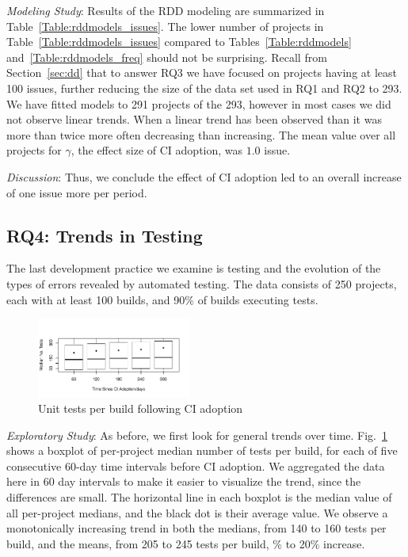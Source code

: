 

\smallskip\noindent \emph{Modeling Study}:
Results of the RDD modeling are summarized in Table~\ref{Table:rddmodels_issues}.
The lower number of projects in Table~\ref{Table:rddmodels_issues} 
compared to Tables~\ref{Table:rddmodels} and~\ref{Table:rddmodels_freq} 
should not be surprising. 
Recall from Section~\ref{sec:dd} that to answer RQ3 we have focused on 
projects having at least 100 issues, further reducing the size of the data set 
used in RQ1 and RQ2 to 293.
We have fitted models to 291 projects of the 293, however in most cases we 
did not observe linear trends.
When a linear trend has been observed than it was more than twice more 
often decreasing than increasing.
The mean value over all projects for $\gamma$, the effect size of CI adoption, 
was $1.0$ issue.


\smallskip\noindent \emph{Discussion}:
 Thus, we conclude the effect of CI adoption led to an overall increase of one 
 issue more per period.




\subsection{RQ4: Trends in Testing}

The last development practice we examine is testing and the evolution 
of the types of errors revealed by automated testing.
The data consists of 250 projects, each with at least 100 builds, and 90\% 
of builds executing tests.

\begin{figure}[!t]
\centering
\includegraphics[width=0.45\textwidth, clip=true, trim=0 15 15 50]{tests.pdf}
\caption{Unit tests per build following CI adoption}
\label{Fig:Tests}
\end{figure}

\smallskip\noindent \emph{Exploratory Study}: 
As before, we first look for general trends over time.
Fig.~\ref{Fig:Tests} shows a boxplot of per-project median number of tests 
per build, for each of five consecutive 60-day time intervals before CI adoption.
We aggregated the data here in 60 day intervals to make it easier to visualize 
the trend, since the differences are small.
The horizontal line in each boxplot is the median value of all per-project medians, 
and the black dot is their average value.
We observe a monotonically increasing trend in both the medians, from 140 to 
160 tests per build, and the means, from 205 to 245 tests per build, \% to 
20\% increase. 

